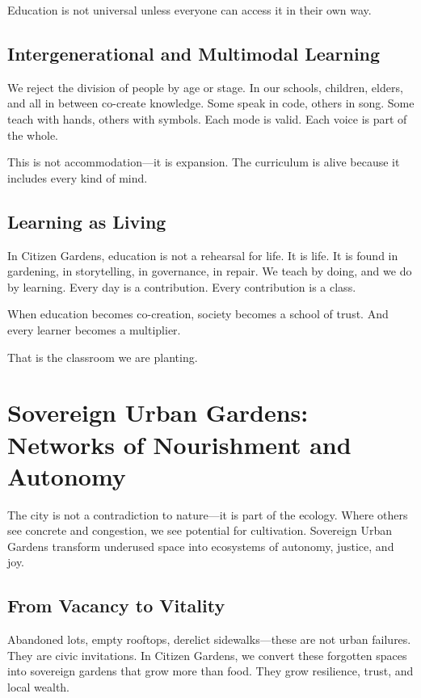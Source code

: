 \documentclass[12pt]{article}
\begin{document}
Education is not universal unless everyone can access it in their own way.

\subsection{Intergenerational and Multimodal Learning}

We reject the division of people by age or stage. In our schools, children, elders, and all in between co-create knowledge. Some speak in code, others in song. Some teach with hands, others with symbols. Each mode is valid. Each voice is part of the whole.

This is not accommodation—it is expansion. The curriculum is alive because it includes every kind of mind.

\subsection{Learning as Living}

In Citizen Gardens, education is not a rehearsal for life. It is life. It is found in gardening, in storytelling, in governance, in repair. We teach by doing, and we do by learning. Every day is a contribution. Every contribution is a class.

When education becomes co-creation, society becomes a school of trust. And every learner becomes a multiplier.

That is the classroom we are planting.


\section{Sovereign Urban Gardens: Networks of Nourishment and Autonomy}

The city is not a contradiction to nature—it is part of the ecology. Where others see concrete and congestion, we see potential for cultivation. Sovereign Urban Gardens transform underused space into ecosystems of autonomy, justice, and joy.

\subsection{From Vacancy to Vitality}

Abandoned lots, empty rooftops, derelict sidewalks—these are not urban failures. They are civic invitations. In Citizen Gardens, we convert these forgotten spaces into sovereign gardens that grow more than food. They grow resilience, trust, and local wealth.
\end{document}
